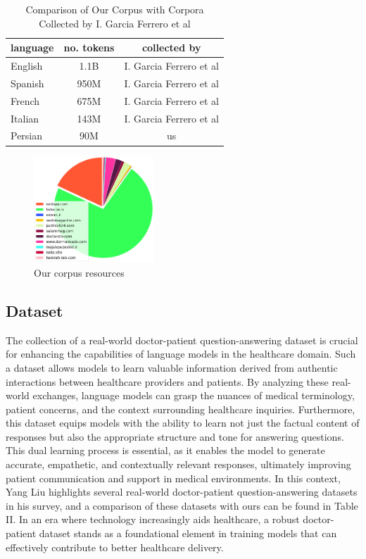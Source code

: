\documentclass[conference]{IEEEtran}
\begin{document}
\begin{table}[ht]
	\centering
	\caption{Comparison of Our Corpus with Corpora Collected by I. Garcia Ferrero et al}
	\begin{tabular}{|l|c|c|}  %
		\hline
		language& no. tokens & collected by \\ \hline
		English & 1.1B & I. Garcia Ferrero et al \\ \hline
		Spanish & 950M & I. Garcia Ferrero et al  \\ \hline
		French & 675M & I. Garcia Ferrero et al  \\ \hline
		Italian& 143M &  I. Garcia Ferrero et al  \\ \hline
		Persian& 90M & us	\\ \hline
	\end{tabular}
	\label{tab:model_results_on_mcqa}
\end{table}

\begin{figure}[htbp]
	\centerline{\includegraphics[width=0.4\textwidth]{fig1.png}}
	\caption{Our corpus resources}
	\label{fig1}
\end{figure}

\subsection{Dataset}
The collection of a real-world doctor-patient question-answering dataset is crucial for enhancing the capabilities of language models in the healthcare domain. Such a dataset allows models to learn valuable information derived from authentic interactions between healthcare providers and patients. By analyzing these real-world exchanges, language models can grasp the nuances of medical terminology, patient concerns, and the context surrounding healthcare inquiries. Furthermore, this dataset equips models with the ability to learn not just the factual content of responses but also the appropriate structure and tone for answering questions. This dual learning process is essential, as it enables the model to generate accurate, empathetic, and contextually relevant responses, ultimately improving patient communication and support in medical environments. In this context, Yang Liu \cite{b6} highlights several real-world doctor-patient question-answering datasets in his survey, and a comparison of these datasets with ours can be found in Table II. In an era where technology increasingly aids healthcare, a robust doctor-patient dataset stands as a foundational element in training models that can effectively contribute to better healthcare delivery.
\end{document}
